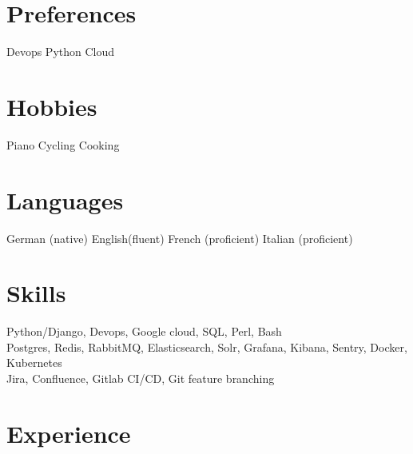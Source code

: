 \documentclass[]{cv-style}          %
\begin{document}
\begin{aside}
\section{Preferences}
Devops
Python
Cloud
%
\section{Hobbies}
Piano
Cycling
Cooking
%
\section{Languages}
German (native)
English(fluent)
French (proficient)
Italian (proficient)
%

\end{aside}


\section{Skills}
  \vspace{-0.2cm}

Python/Django, Devops, Google cloud, SQL, Perl, Bash\\
Postgres, Redis, RabbitMQ, Elasticsearch, Solr, Grafana, Kibana, Sentry, Docker, Kubernetes\\
Jira, Confluence, Gitlab CI/CD, Git feature branching


\section{Experience}
\end{document}
